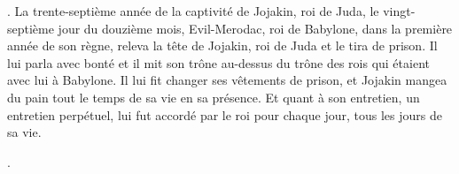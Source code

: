 \begin{multicols}{2}
.
La trente-septième année de la captivité de Jojakin, roi de Juda, le vingt-septième jour du douzième mois, Evil-Merodac, roi de Babylone, dans la première année de son règne, releva la tête de Jojakin, roi de Juda et le tira de prison.
Il lui parla avec bonté et il mit son trône au-dessus du trône des rois qui étaient avec lui à Babylone.
Il lui fit changer ses vêtements de prison, et Jojakin mangea du pain tout le temps de sa vie en sa présence.
Et quant à son entretien, un entretien perpétuel, lui fut accordé par le roi pour chaque jour, tous les jours de sa vie.
\PPE{}
\end{multicols}.
